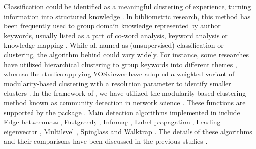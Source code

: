Classification could be identified as a meaningful clustering of
experience, turning information into structured knowledge
\citep{kwasnik1999role}. In bibliometric research, this method has been
frequently used to group domain knowledge represented by author
keywords, usually listed as a part of co-word analysis, keyword analysis
or knowledge mapping
\citep{he1999knowledge, hu2013co, leung2017bibliometrics, li2017knowledge, wang2018three}.
While all named as (unsupervised) classification or clustering, the
algorithm behind could vary widely. For instance, some researches have
utilized hierarchical clustering to group keywords into different themes
\citep{hu2015research, khasseh2017intellectual}, whereas the studies
applying VOSviewer have adopted a weighted variant of modularity-based
clustering with a resolution parameter to identify smaller clusters
\citep{van2010software}. In the framework of , we have
utilized the modularity-based clustering method known as community
detection in network science \citep{newman2004fast, Murata2010}. These
functions are supported by the  package
\citep{csardi2006igraph}. Main detection algorithms implemented in
 include Edge betweenness \citep{girvan2002community},
Fastgreedy \citep{Clauset}, Infomap
\citep{rosvall2007information, rosvall2009map}, Label propagation
\citep{raghavan2007near}, Leading eigenvector \citep{newman2006finding},
Multilevel \citep{Blondel_2008}, Spinglass
\citep{reichardt2006statistical} and Walktrap \citep{pons2005computing}.
The details of these algorithms and their comparisons have been
discussed in the previous studies
\citep{de2014evaluating, yang2016comparative, garg2017comparative, 8620850}.

